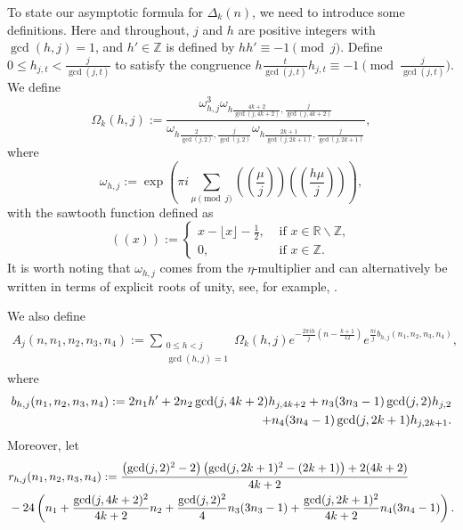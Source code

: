 \documentclass[12pt]{article}
\numberwithin{equation}{section}
\begin{document}
To state our asymptotic formula for $\Delta_{k}(n)$, we need to introduce some definitions. Here and throughout, $j$ and $h$ are positive integers with $\gcd(h, j)= 1$, and $h'\in\mathbb{Z}$ is defined by $hh' \equiv -1 \pmod j$. Define $0 \leq h_{j, t}<\frac{j}{\gcd(j, t)}$ to satisfy the congruence $h \frac{t}{\gcd(j, t)} h_{j, t} \equiv-1\pmod {\frac{j}{\gcd(j, t)}}$. We define
\begin{equation}\label{def:Omega}
\Omega_{k}(h,j):=\frac{\omega_{h,j}^3\omega_{h\frac{4k+2}{\gcd(j, 4k+2)},\frac{j}{\gcd(j, 4k+2)}}}{\omega_{h\frac{2}{\gcd(j, 2)},\frac{j}{\gcd(j, 2)}}\omega_{h\frac{2k+1}{\gcd(j, 2k+1)},\frac{j}{\gcd(j, 2k+1)}}},
\end{equation}
where
$$
\omega_{h, j}:=\exp \left(\pi i\sum_{\mu \pmod j}\left(\left(\frac{\mu}{j}\right)\right)\left(\left(\frac{h \mu}{j}\right)\right)\right),
$$
with the sawtooth function defined as
$$
((x)):= \begin{cases}x-\lfloor x\rfloor-\frac{1}{2}, & \text { if } x \in \mathbb{R} \backslash \mathbb{Z},
\\ 0, & \text { if } x \in \mathbb{Z} .\end{cases}
$$
It is worth noting that $\omega_{h, j}$ comes from the $\eta$-multiplier and can alternatively be written in terms of explicit roots of unity, see, for example, \cite[(5.2.4)]{Andrews-1976}.

We also define
\begin{align}\label{def:Aj}
A_{j}(n,n_1,n_2,n_3,n_4):=\sum_{\substack{0 \leq h < j \\ \gcd(h,j) = 1}}\Omega_{k}(h,j) e^{-\frac{2\pi i h}{j}\left(n-\frac{k+ 1}{12}\right)}
e^{\frac{\pi i}{j}b_{h,j}(n_1,n_2,n_3,n_4)},
\end{align}
where
\begin{align}\label{def:b}
b_{h,j}(n_1,n_2,n_3,n_4):=2n_1 h'+2n_2\gcd(j,4k+2)h_{j,4k+2}+n_3(3n_3-1)\gcd(j,2)h_{j,2}
\notag\\
+n_4(3n_4-1)\gcd(j,2k+1)h_{j,2k+1}.
\end{align}
Moreover, let
\begin{align}\label{def:r}
&r_{h,j}(n_1,n_2,n_3,n_4)
:=\frac{\left(\gcd(j,2)^2-2\right)\left(\gcd(j,2k+1)^2
-(2k+1)\right)+2(4k+2)}{4k+2}
\\\notag
&-24\left(n_1+\frac{\gcd(j,4k+2)^2}{4k+2}n_2
+\frac{\gcd(j,2)^2}{4}n_3(3n_3-1)
+\frac{\gcd(j,2k+1)^2}{4k+2}n_4(3n_4-1)\right).
\end{align}
\end{document}
